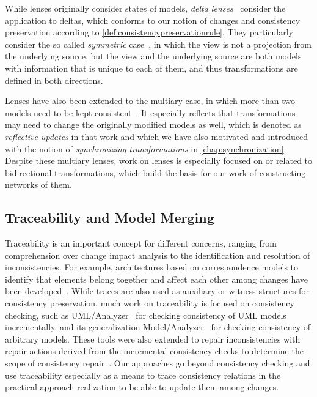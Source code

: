 While lenses originally consider states of models, \emph{delta lenses}~\cite{diskin2011StateToDeltaSymmetric-MODELS} consider the application to deltas, which conforms to our notion of changes and consistency preservation according to \autoref{def:consistencypreservationrule}.
They particularly consider the so called \emph{symmetric} case~\cite{diskin2011StateToDeltaSymmetric-MODELS}, in which the view is not a projection from the underlying source, but the view and the underlying source are both models with information that is unique to each of them, and thus transformations are defined in both directions.

Lenses have also been extended to the multiary case, in which more than two models need to be kept consistent~\cite{diskin2018MultiModelSynchronization-FASE}.
It especially reflects that transformations may need to change the originally modified models as well, which is denoted as \emph{reflective updates} in that work and which we have also motivated and introduced with the notion of \emph{synchronizing transformations} in \autoref{chap:synchronization}.
Despite these multiary lenses, work on lenses is especially focused on or related to bidirectional transformations, which build the basis for our work of constructing networks of them.


\subsection{Traceability and Model Merging}

Traceability is an important concept for different concerns, ranging from comprehension over change impact analysis to the identification and resolution of inconsistencies.
For example, architectures based on correspondence models to identify that elements belong together and affect each other among changes have been developed~\cite{szabo2013traceabilityConsistency-ASWEC}.
While traces are also used as auxiliary or witness structures for consistency preservation, much work on traceability is focused on consistency checking, such as UML/Analyzer~\cite{egyed2006umlanalyzer-ICSE} for checking consistency of \gls{UML} models incrementally, and its generalization Model/Analyzer~\cite{egyed2011modelanalyzer-TSE} for checking consistency of arbitrary models.
These tools were also extended to repair inconsistencies with repair actions derived from the incremental consistency checks to determine the scope of consistency repair~\cite{reder2012resolvingInconsistencies-ASE}.
Our approaches go beyond consistency checking and use traceability especially as a means to trace consistency relations in the practical approach realization to be able to update them among changes.

